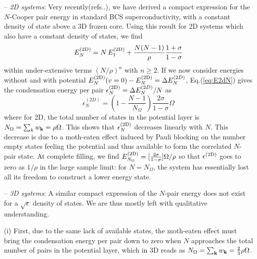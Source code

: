 \documentclass[5p,twocolumn]{elsarticle}
\begin{document}
-- {\it 2D systems}: Very recently(refs..), we have derived a compact expression for the $N$-Cooper pair energy in standard BCS superconductivity, with a constant density of state above a 3D frozen core. Using this result for 2D systems which also have a constant density of states, we find
\begin{equation}\label{eq:E2dN}
 E^{{\text{(2D)}}}_N=N\,E^{{\text{(2D)}}}_1+\frac{N(N-1)}{\rho}\frac{1+\sigma}{1-\sigma}
\end{equation}
within under-extensive terms $(N/\rho)^n$ with $n\geqslant2$.
If we now consider energies without and with potential
$
E_N^{{{\text{(2D)}}}}(v=0)-E_N^{{\text{(2D)}}}= 
\Delta E^{(2D)}_N
$,
Eq.(\ref{eq:E2dN}) gives the condensation energy per pair $\epsilon_N^{{\text{(2D)}}} = \Delta E^{(2D)}_N/N$ as
  \begin{equation}
\epsilon^{(2D)}_N=(1-\frac{N-1}{N_\Omega})\frac{2\sigma}{1-\sigma}\Omega\label{eq:E2D}
\end{equation}
where for 2D, the total number of states in the potential layer is $N_\Omega=\sum_k{}w_{\mathbf{k}}=\rho\Omega$. This shows that $\epsilon^{{\text{(2D)}}}_N$  decreases linearly with $N$. This decrease is due to a moth-eaten effect induced by Pauli blocking on the number empty states feeling the potential and thus available to form the correlated $N$-pair state.  At complete filling, we find $
 E^{{\text{(2D)}}}_{N_\Omega}=[\frac{2\sigma}{1-\sigma}]\Omega/\rho
$
so that $
 \epsilon^{{\text{(2D)}}}$ goes to zero as $1/\rho$ in the large sample limit: for $N=N_\Omega$, the system has  essentially lost all its freedom to construct a lower energy state.






-- {\it 3D systems}: A  similar compact expression of the $N$-pair energy does not exist for a $\sqrt{\epsilon}$ density of states. We are thus mostly left with qualitative understanding. 

(i) First, due to the same lack of available states, the moth-eaten effect must bring the condensation energy per pair down to zero when $N$ approaches the total number of pairs in the potential layer, which in 3D reads as $N_\Omega=\sum_{\mathbf{k}}w_{\mathbf{k}}=\frac{2}{3}\rho\Omega$. 
\end{document}
